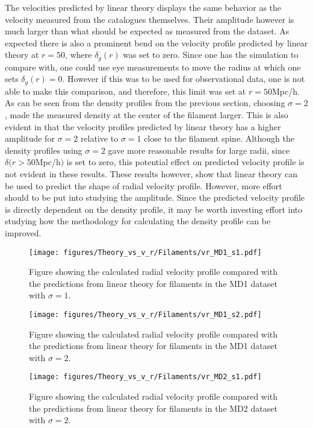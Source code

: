 The velocities predicted by linear theory displays the same behavior as the velocity measured from the catalogues themselves. Their amplitude however is much larger than what should be expected as measured from the dataset. As expected there is also a prominent bend on the velocity profile predicted by linear theory at $r=50$, where $\delta_g(r)$ was set to zero. Since one has the simulation to compare with, one could use eye measurements to move the radius at which one sets $\delta_g(r)=0$. However if this was to be used for observational data, one is not able to make this comparison, and therefore, this limit was set at $r=50$Mpc/h. As can be seen from the density profiles from the previous section, choosing $\sigma=2$, made the measured density at the center of the filament larger. This is also evident in that the velocity profiles predicted by linear theory has a higher amplitude for $\sigma=2$ relative to $\sigma=1$ close to the filament spine. Although the density profiles using $\sigma=2$ gave more reasonable results for large radii, since $\delta(r>50$Mpc/h$)$ is set to zero, this potential effect on predicted velocity profile is not evident in these results. These results however, show that linear theory can be used to predict the shape of radial velocity profile. However, more effort should to be put into studying the amplitude. Since the predicted velocity profile is directly dependent on the density profile, it may be worth investing effort into studying how the methodology for calculating the density profile can be improved. 


\begin{figure}[H]
    \texttt{[image: figures/Theory\_vs\_v\_r/Filaments/vr\_MD1\_s1.pdf]}
    \caption{Figure showing the calculated radial velocity profile compared with the predictions from linear theory for filaments in the MD1 dataset with $\sigma=1$.}
    \label{fig:filvrMD1s1}
\end{figure}

\begin{figure}[H]
    \texttt{[image: figures/Theory\_vs\_v\_r/Filaments/vr\_MD1\_s2.pdf]}
    \caption{Figure showing the calculated radial velocity profile compared with the predictions from linear theory for filaments in the MD1 dataset with $\sigma=2$.}
    \label{fig:filvrMD1s2}
\end{figure}

\begin{figure}[H]
    \texttt{[image: figures/Theory\_vs\_v\_r/Filaments/vr\_MD2\_s1.pdf]}
    \caption{Figure showing the calculated radial velocity profile compared with the predictions from linear theory for filaments in the MD2 dataset with $\sigma=2$.}
    \label{fig:filvrMD2s1}
\end{figure}


